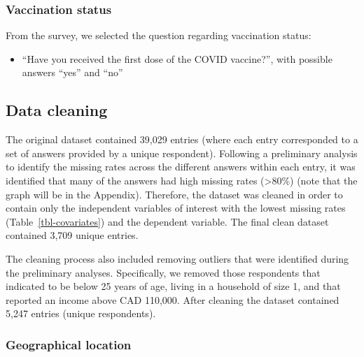 \documentclass[
  letterpaper,
  DIV=11,
  numbers=noendperiod]{scrartcl}
\providecommand{\tightlist}{%
  \setlength{\itemsep}{0pt}\setlength{\parskip}{0pt}}\usepackage{longtable,booktabs,array}
\begin{document}
\hypertarget{vaccination-status}{%
\subsubsection{Vaccination status}\label{vaccination-status}}

From the survey, we selected the question regarding vaccination status:

\begin{itemize}
\tightlist
\item
  ``Have you received the first dose of the COVID vaccine?'', with
  possible answers ``yes'' and ``no''
\end{itemize}

\hypertarget{data-cleaning}{%
\subsection{Data cleaning}\label{data-cleaning}}

The original dataset contained 39,029 entries (where each entry
corresponded to a set of answers provided by a unique respondent).
Following a preliminary analysis to identify the missing rates across
the different answers within each entry, it was identified that many of
the answers had high missing rates (\textgreater80\%) (note that the
graph will be in the Appendix). Therefore, the dataset was cleaned in
order to contain only the independent variables of interest with the
lowest missing rates (Table~\ref{tbl-covariates}) and the dependent
variable. The final clean dataset contained 3,709 unique entries.

The cleaning process also included removing outliers that were
identified during the preliminary analyses. Specifically, we removed
those respondents that indicated to be below 25 years of age, living in
a household of size 1, and that reported an income above CAD 110,000.
After cleaning the dataset contained 5,247 entries (unique respondents).

\hypertarget{sec-geographical-location}{%
\subsubsection{Geographical location}\label{sec-geographical-location}}
\end{document}
